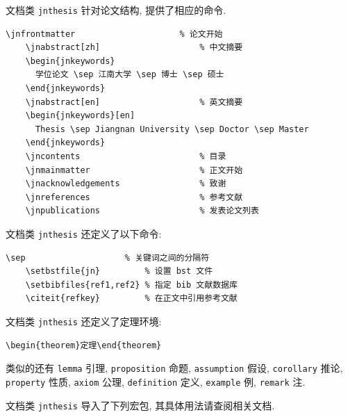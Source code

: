 文档类 {\tt jnthesis} 针对论文结构, 提供了相应的命令.

\begin{lstlisting}[basicstyle=\ttfamily, frame=single]
    \jnfrontmatter                     % 论文开始
    \jnabstract[zh]                    % 中文摘要
    \begin{jnkeywords}
      学位论文 \sep 江南大学 \sep 博士 \sep 硕士
    \end{jnkeywords}
    \jnabstract[en]                    % 英文摘要
    \begin{jnkeywords}[en]
      Thesis \sep Jiangnan University \sep Doctor \sep Master
    \end{jnkeywords}
    \jncontents                        % 目录
    \jnmainmatter                      % 正文开始
    \jnacknowledgements                % 致谢
    \jnreferences                      % 参考文献
    \jnpublications                    % 发表论文列表
\end{lstlisting}

文档类 {\tt jnthesis} 还定义了以下命令:

\begin{lstlisting}[basicstyle=\ttfamily, frame=single]
    \sep                    % 关键词之间的分隔符
    \setbstfile{jn}         % 设置 bst 文件
    \setbibfiles{ref1,ref2} % 指定 bib 文献数据库
    \citeit{refkey}         % 在正文中引用参考文献
\end{lstlisting}

文档类 {\tt jnthesis} 还定义了定理环境:

\begin{lstlisting}[basicstyle=\ttfamily, frame=single]
\begin{theorem}定理\end{theorem}
\end{lstlisting}

类似的还有 {\tt lemma} 引理,
{\tt proposition} 命题,
{\tt assumption} 假设,
{\tt corollary} 推论,
{\tt property} 性质,
{\tt axiom} 公理,
{\tt definition} 定义,
{\tt example} 例,
{\tt remark} 注.


文档类 {\tt jnthesis} 导入了下列宏包,
其具体用法请查阅相关文档.

